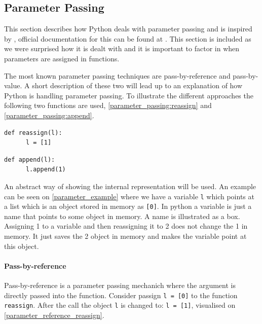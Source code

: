 \subsection{Parameter Passing}
This section describes how Python deals with parameter passing and is inspired by \citet{parameter_passing}, official documentation for this can be found at \citet{parameter_passing_official}.
This section is included as we were surprised how it is dealt with and it is important to factor in when parameters are assigned in functions.

The most known parameter passing techniques are pass-by-reference and pass-by-value.
A short description of these two will lead up to an explanation of how Python is handling parameter passing.
To illustrate the different approaches the following two functions are used, \cref{parameter_passing:reassign} and \cref{parameter_passing:append}.

\begin{lstlisting}[style=python, caption={Parameter passing: \texttt{reassign} function.}, label={parameter_passing:reassign}]
  def reassign(l):
      l = [1]
\end{lstlisting}

\begin{lstlisting}[style=python, caption={Parameter passing: \texttt{append} function.}, label={parameter_passing:append}]
  def append(l):
      l.append(1)
\end{lstlisting}

An abstract way of showing the internal representation will be used.
An example can be seen on \cref{parameter_example} where we have a variable \texttt{l} which points at a list which is an object stored in memory as \texttt{[0]}.
In python a variable is just a name that points to some object in memory.
A name is illustrated as a box.
Assigning 1 to a variable and then reassigning it to 2 does not change the 1 in memory.
It just saves the 2 object in memory and makes the variable point at this object.


\paragraph{Pass-by-reference}
Pass-by-reference is a parameter passing mechanich where the argument is directly passed into the function.
Consider passign \texttt{l = [0]} to the function \texttt{reassign}.
After the call the object \texttt{l} is changed to: \texttt{l = [1]}, visualised on \cref{parameter_reference_reassign}.

